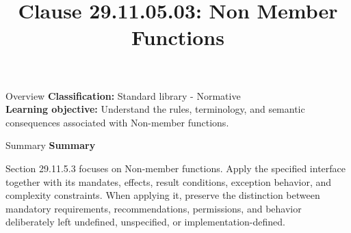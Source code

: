 \documentclass[10pt,letterpaper]{article}
\title{Clause 29.11.05.03: Non Member Functions}
\author{}
\date{}
\begin{document}
\maketitle
\begin{CornellOverviewBox}{Overview}
\textbf{Classification:} Standard library - Normative\\[2pt]
\textbf{Learning objective:} Understand the rules, terminology, and semantic consequences associated with Non-member functions.
\end{CornellOverviewBox}\begin{CornellSummaryBox}{Summary}
{\sffamily\bfseries\color{Accent} Summary}\par\vspace{3pt}Section 29.11.5.3 focuses on Non-member functions. Apply the specified interface together with its mandates, effects, result conditions, exception behavior, and complexity constraints. When applying it, preserve the distinction between mandatory requirements, recommendations, permissions, and behavior deliberately left undefined, unspecified, or implementation-defined.
\end{CornellSummaryBox}
\end{document}
